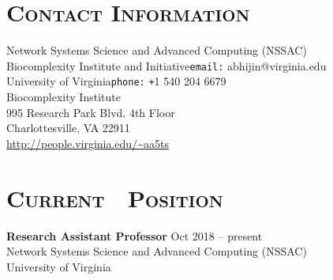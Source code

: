 \documentclass[10pt]{article} %
\begin{document}
\thispagestyle{fancy}


\begin{resume}

\section{\textnormal{\textsc{Contact Information}}}
Network Systems Science and Advanced Computing (NSSAC)\\
Biocomplexity Institute and Initiative\hfill \texttt{email:}
abhijin@virginia.edu\hspace{0mm}\mbox{}\\
University of Virginia\hfill \texttt{phone:}
\texttt{+}1 540 204 6679\hspace{6.5mm}\mbox{}\\
Biocomplexity Institute \\
995 Research Park Blvd. 4th Floor \\
Charlottesville, VA 22911 \\
\url{http://people.virginia.edu/~aa5ts}
\section{\textnormal{\textsc{Current\,\,\,\, Position}}}
\textbf{Research Assistant Professor} \hfill Oct 2018 -- present\\
Network Systems Science and Advanced Computing (NSSAC)\\
University of Virginia

\end{resume}
\end{document}

